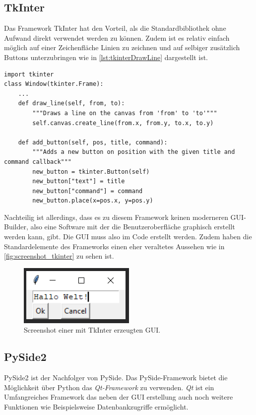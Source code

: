 \subsection{TkInter}
Das Framework TkInter hat den Vorteil, als die Standardbibliothek ohne Aufwand direkt verwendet werden zu können. Zudem ist es relativ einfach möglich auf einer Zeichenfläche Linien zu zeichnen und auf selbiger zusätzlich Buttons unterzubringen wie in \autoref{lst:tkinterDrawLine} dargestellt ist.
\begin{lstlisting}[caption={Zeichnen von Linien und Buttons mit TkInter},label=lst:tkinterDrawLine]
import tkinter
class Window(tkinter.Frame):
	...
	def draw_line(self, from, to):
		"""Draws a line on the canvas from 'from' to 'to'"""
		self.canvas.create_line(from.x, from.y, to.x, to.y)
	
	def add_button(self, pos, title, command):
		"""Adds a new button on position with the given title and command callback"""
		new_button = tkinter.Button(self)
		new_button["text"] = title
		new_button["command"] = command
		new_button.place(x=pos.x, y=pos.y)
\end{lstlisting}

Nachteilig ist allerdings, dass es zu diesem Framework keinen moderneren \ac{GUI}-Builder, also eine Software mit der die Benutzeroberfläche graphisch erstellt werden kann, gibt. Die \ac{GUI} muss also im Code erstellt werden. Zudem haben die Standardelemente des Frameworks einen eher veraltetes Aussehen wie in \autoref{fig:screenshot_tkinter} zu sehen ist.

\begin{figure}[h]
\begin{center}
\includegraphics[scale=0.7]{images/tkinter_screenshot.png}
\caption{Screenshot einer mit TkInter erzeugten GUI.}
\label{fig:screenshot_tkinter}
\end{center}
\end{figure}

\subsection{PySide2}
PySide2 ist der Nachfolger von PySide. Das PySide-Framework bietet die Möglichkeit über Python das \textit{Qt-Framework} zu verwenden. \textit{Qt} ist ein Umfangreiches Framework das neben der \ac{GUI} erstellung auch noch weitere Funktionen wie Beispielsweise Datenbankzugriffe ermöglicht.

